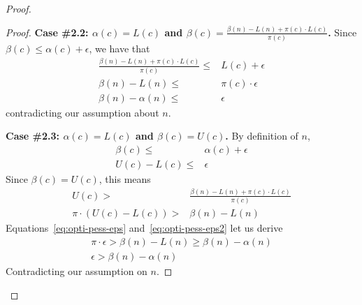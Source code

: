 \documentclass[runningheads]{llncs}
\newcommand{\pess}{\mathit{L}}
\newcommand{\opti}{\mathit{U}}
\begin{document}
\begin{proof}
\begin{proof}
{\bf Case \#2.2: $\alpha(c)=\pess(c)$ 
	and $\beta(c)=\frac{\beta(n)-\pess(n)+\pi(c)\cdot\pess(c)}{\pi(c)}$.} 
Since $\beta(c)\leq \alpha(c)+\epsilon$, we have that
\begin{align}
\frac{\beta(n)-\pess(n)+\pi(c)\cdot\pess(c)}{\pi(c)} \leq & \pess(c)+\epsilon \\
\beta(n)-\pess(n) \leq & \pi(c)\cdot \epsilon \\
\beta(n)-\alpha(n) \leq & \epsilon 
\end{align}
contradicting our assumption about $n$. 

{\bf Case \#2.3: $\alpha(c)=\pess(c)$ and $\beta(c)=\opti(c)$.} 
By definition of $n$, 
\begin{align}
\beta(c)\leq & \alpha(c)+\epsilon\\
\opti(c)-\pess(c)\leq  & \epsilon \label{eq:opti-pess-eps}
\end{align}
Since $\beta(c)=\opti(c)$, this means 
\begin{align}
\opti(c)>& \frac{\beta(n)-\pess(n)+\pi(c)\cdot\pess(c)}{\pi(c)} \\
\pi\cdot(\opti(c)-\pess(c))>& \beta(n)-\pess(n) \label{eq:opti-pess-eps2}
\end{align}
Equations~\eqref{eq:opti-pess-eps} and~\eqref{eq:opti-pess-eps2} let us derive
\begin{align}
\pi\cdot\epsilon > \beta(n)-\pess(n) \geq \beta(n)-\alpha(n) \\
\epsilon > \beta(n)-\alpha(n) 
\end{align}
Contradicting our assumption on $n$. 


\end{proof}
\end{proof}
\end{document}

